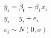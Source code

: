 \begin{eqnarray}
	\hat{y}_i = \beta_0 + \beta_1 x_i \label{eq24_01}\\
	y_i = \hat{y}_i + e_i \label{eq24_02}\\
	e_i \sim N(0,\sigma)\label{eq24_03}
\end{eqnarray}
